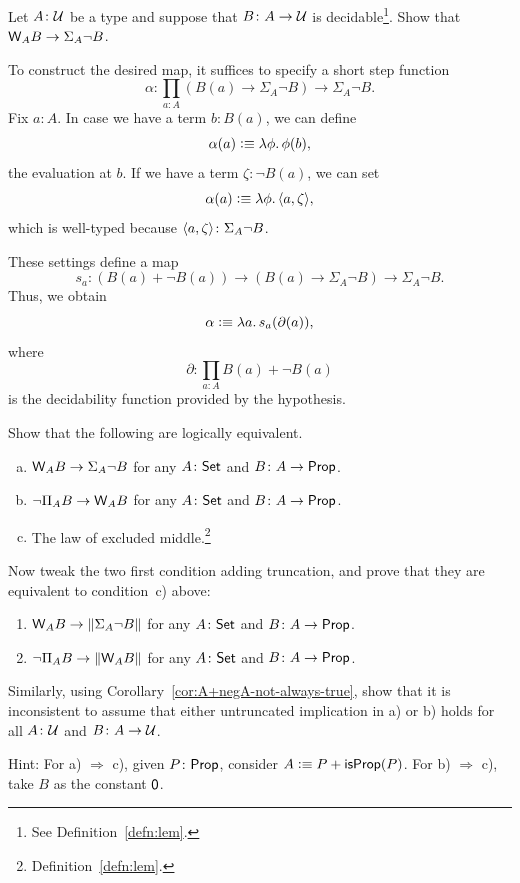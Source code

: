 \begin{exr}\label{exr:W-to-Sigma-decidable-arity}
    Let\/ $A\colon\univ$ be a type and suppose that\/ $B\colon A\to\univ$ is decidable\footnote{See Definition~\ref{defn:lem}.}. Show that\/ $\mathsf{W}_AB\to\Sigma_A\neg B$.
\end{exr}

\begin{solution}
    To construct the desired map, it suffices to specify a short step function
    \[
        \alpha\colon\prod_{a\colon A}
            (B(a)\to\Sigma_A\neg B)\to\Sigma_A\neg B.
    \]
    Fix $a\colon A$. In case we have a term $b\colon B(a)$, we can define
    \[
        \alpha(a)\mathrel{\vcentcolon}\equiv\lambda\phi.\,\phi(b),
    \]
    the evaluation at $b$. If we have a term $\zeta\colon\neg B(a)$, we can set
    \[
        \alpha(a)\mathrel{\vcentcolon}\equiv\lambda\phi.\,\langle a,\zeta\rangle,
    \]
    which is well-typed because $\dep{a,\zeta}\colon\Sigma_A\neg B$.
    
    These settings define a map
    \[
        s_a\colon(B(a)+\neg B(a))\to(B(a)\to\Sigma_A\neg B)
            \to\Sigma_A\neg B.
    \]
    Thus, we obtain
    \[
        \alpha\mathrel{\vcentcolon}\equiv\lambda a.\,s_a(\partial(a)),
    \]
    where
    \[
        \partial\colon\prod_{a\colon A}B(a)+\neg B(a)
    \]
    is the decidability function provided by the hypothesis.
\end{solution}

\begin{exr}
    Show that the following are logically equivalent.
    \begin{enumerate}[a),font=\upshape]
        \item $\mathsf{W}_AB\to\Sigma_A\neg B$ for any\/ $A\colon\fun{Set}$ and\/ $B\colon A\to\fun{Prop}$.
        
        \item $\neg\Pi_AB\to\mathsf{W}_AB$ for any\/ $A\colon\fun{Set}$ and\/ $B\colon A\to\fun{Prop}$.
        
        \item The law of excluded middle.\footnote{Definition~\ref{defn:lem}.}
    \end{enumerate}
    Now tweak the two first condition adding truncation, and prove that they are equivalent to condition~c) above:
    \begin{enumerate}[a'),font=\upshape]
        \item $\mathsf{W}_AB\to\lVert\Sigma_A\neg B\rVert$ for any\/ $A\colon\fun{Set}$ and\/ $B\colon A\to\fun{Prop}$.
        
        \item $\neg\Pi_AB\to\lVert\mathsf{W}_AB\rVert$ for any\/ $A\colon\fun{Set}$ and\/ $B\colon A\to\fun{Prop}$.
    \end{enumerate}
    
    Similarly, using\/ {\upshape Corollary~\ref{cor:A+negA-not-always-true}}, show that it is inconsistent to assume that either untruncated implication in\/ {\upshape a)} or\/ {\upshape b)} holds for all\/ $A\colon\univ$ and\/ $B\colon A\to\univ$.

    {\upshape Hint: For a) $\Rightarrow$ c), given $P\colon\fun{Prop}$, consider $A\mathrel{\vcentcolon}\equiv P+\mathsf{isProp}(P)$. For b) $\Rightarrow$ c), take $B$ as the constant $\mathsf{0}$.}
\end{exr}

